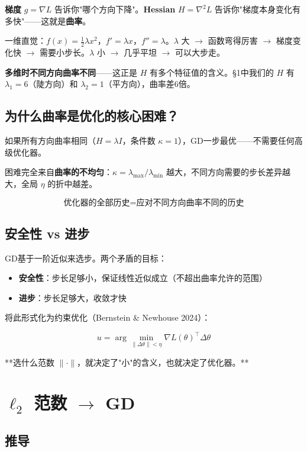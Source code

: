 \documentclass[12pt,a4paper]{article}
\begin{document}
\textbf{梯度} $g = \nabla L$ 告诉你"哪个方向下降"。\textbf{Hessian} $H = \nabla^2 L$ 告诉你"梯度本身变化有多快"——这就是\textbf{曲率}。

一维直觉：$f(x) = \frac{1}{2}\lambda x^2$，$f' = \lambda x$，$f'' = \lambda$。$\lambda$ 大 $\to$ 函数弯得厉害 $\to$ 梯度变化快 $\to$ 需要小步长。$\lambda$ 小 $\to$ 几乎平坦 $\to$ 可以大步走。

\textbf{多维时不同方向曲率不同}——这正是 $H$ 有多个特征值的含义。§1中我们的 $H$ 有 $\lambda_1 = 6$（陡方向）和 $\lambda_2 = 1$（平方向），曲率差6倍。


\subsection{为什么曲率是优化的核心困难？}

如果所有方向曲率相同（$H = \lambda I$，条件数 $\kappa = 1$），GD一步最优——不需要任何高级优化器。

困难完全来自\textbf{曲率的不均匀}：$\kappa = \lambda_{\max}/\lambda_{\min}$ 越大，不同方向需要的步长差异越大，全局 $\eta$ 的折中越差。


\[\text{优化器的全部历史} = \text{应对不同方向曲率不同的历史}\]


\subsection{安全性 vs 进步}

GD基于一阶近似来选步。两个矛盾的目标：

\begin{itemize}[leftmargin=*,nosep]
\item \textbf{安全性}：步长足够小，保证线性近似成立（不超出曲率允许的范围）
\item \textbf{进步}：步长足够大，收敛才快
\end{itemize}


将此形式化为约束优化（Bernstein \& Newhouse 2024）：


\[u = \arg\min_{\|\Delta\theta\| < \eta} \nabla L(\theta)^\top \Delta\theta\]

**选什么范数 $\|\cdot\|$，就决定了"小"的含义，也就决定了优化器。**




\section{$\ell_2$ 范数 $\to$ GD}


\subsection{推导}
\end{document}
